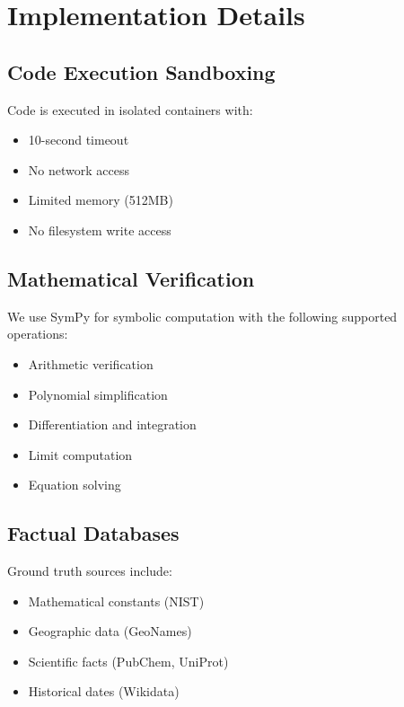 \documentclass[11pt,a4paper]{article}
\begin{document}
\appendix

\section{Implementation Details}
\label{app:implementation}

\subsection{Code Execution Sandboxing}

Code is executed in isolated containers with:
\begin{itemize}
    \item 10-second timeout
    \item No network access
    \item Limited memory (512MB)
    \item No filesystem write access
\end{itemize}

\subsection{Mathematical Verification}

We use SymPy for symbolic computation with the following supported operations:
\begin{itemize}
    \item Arithmetic verification
    \item Polynomial simplification
    \item Differentiation and integration
    \item Limit computation
    \item Equation solving
\end{itemize}

\subsection{Factual Databases}

Ground truth sources include:
\begin{itemize}
    \item Mathematical constants (NIST)
    \item Geographic data (GeoNames)
    \item Scientific facts (PubChem, UniProt)
    \item Historical dates (Wikidata)
\end{itemize}
\end{document}
